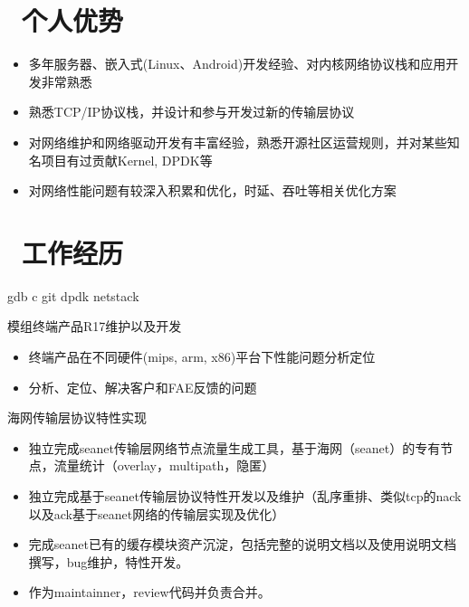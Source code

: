 \documentclass{resume}
\begin{document}


\section{\faInfo\ 个人优势 }
\begin{itemize}[parsep=0.5ex]
	\item 多年服务器、嵌入式(Linux、Android)开发经验、对内核网络协议栈和应用开发非常熟悉
	\item 熟悉TCP/IP协议栈，并设计和参与开发过新的传输层协议
	\item 对网络维护和网络驱动开发有丰富经验，熟悉开源社区运营规则，并对某些知名项目有过贡献Kernel, DPDK等
	\item 对网络性能问题有较深入积累和优化，时延、吞吐等相关优化方案
\end{itemize}

\section{\faUsers\ 工作经历}
\role{资深开发工程师} {gdb  c  git dpdk netstack}
\begin{onehalfspacing}
模组终端产品R17维护以及开发
\begin{itemize}
	\item 终端产品在不同硬件(mips, arm, x86)平台下性能问题分析定位
	\item 分析、定位、解决客户和FAE反馈的问题
\end{itemize}
\end{onehalfspacing}

\begin{onehalfspacing}
海网传输层协议特性实现
\begin{itemize}
  \item 独立完成seanet传输层网络节点流量生成工具，基于海网（seanet）的专有节点，流量统计（overlay，multipath，隐匿）
  \item 独立完成基于seanet传输层协议特性开发以及维护（乱序重排、类似tcp的nack以及ack基于seanet网络的传输层实现及优化）
  \item 完成seanet已有的缓存模块资产沉淀，包括完整的说明文档以及使用说明文档撰写，bug维护，特性开发。
  \item 作为maintainner，review代码并负责合并。
\end{itemize} 
\end{onehalfspacing}
\end{document}
